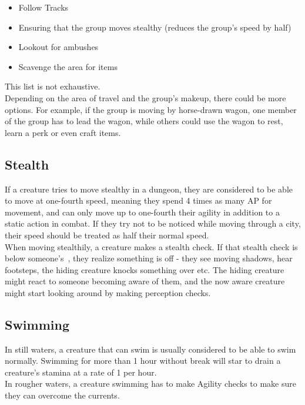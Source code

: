 \begin{itemize}
	\item Follow Tracks

	\item Ensuring that the group moves stealthy (reduces the group's speed by half)

	\item Lookout for ambushes

	\item Scavenge the area for items

\end{itemize}
This list is not exhaustive.\\

Depending on the area of travel and the group's makeup, there could be more options.
For example, if the group is moving by horse-drawn wagon, one member of the group has to lead the wagon, while others could use the wagon to rest, learn a perk or even craft items.

\subsection{Stealth}\label{subsec:stealth}
If a creature tries to move stealthy in a dungeon, they are considered to be able to move at one-fourth speed, meaning they spend 4 times as many AP for movement, and can only move up to one-fourth their agility in addition to a static action in combat.
If they try not to be noticed while moving through a city, their speed should be treated as half their normal speed.\\
When moving stealthily, a creature makes a stealth check.
If that stealth check is below someone's~, they realize something is off - they see moving shadows, hear footsteps, the hiding creature knocks something over etc.
The hiding creature might react to someone becoming aware of them, and the now aware creature might start looking around by making perception checks.

\subsection{Swimming}\label{subsec:swimming}
In still waters, a creature that can swim is usually considered to be able to swim normally.
Swimming for more than 1 hour without break will star to drain a creature's stamina at a rate of 1 per hour.\\
In rougher waters, a creature swimming has to make Agility checks to make sure they can overcome the currents.\\

